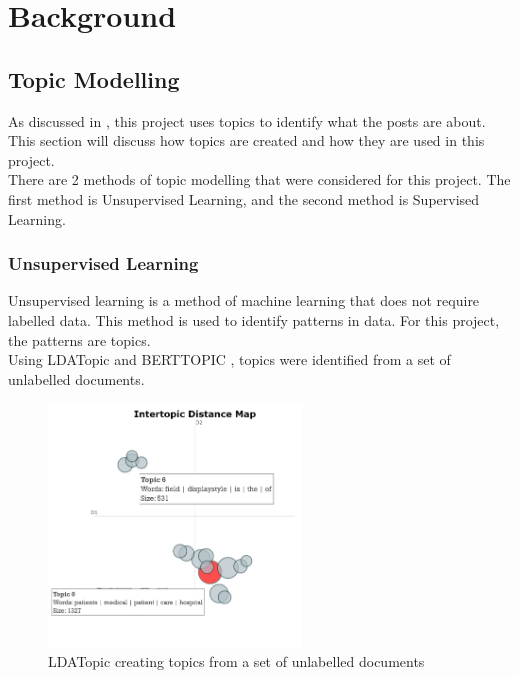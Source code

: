 \chapter{Background}
\label{ch:background}

\section{Topic Modelling}
As discussed in , this project uses topics to identify what the posts are about. This section will discuss
how topics are created and how they are used in this project.\\
There are 2 methods of topic modelling that were considered for this project. The first method is Unsupervised Learning, and the
second method is Supervised Learning.\\
\subsection{Unsupervised Learning}
Unsupervised learning is a method of machine learning that does not require labelled data. This method is used to identify patterns
in data. For this project, the patterns are topics.\\
Using LDATopic \cite{LDATopic} and BERTTOPIC \cite{BERTTOPIC}, topics were identified from a set of unlabelled documents.
\begin{figure}[hbtp]
    \centering
    \includegraphics[width=0.6\textwidth]{../images/ldatopic.png}
    \caption{LDATopic creating topics from a set of unlabelled documents}
    \label{fig:ldatopic}
\end{figure}


